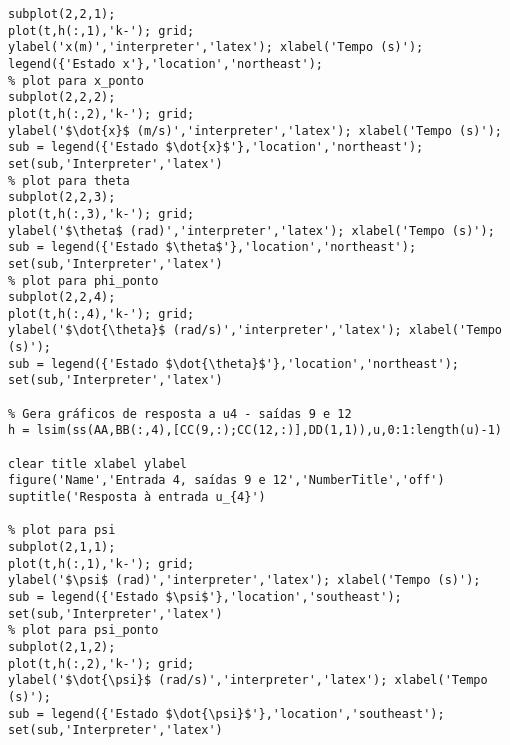 \begin{lstlisting}[inputencoding=latin1]
% plot para x
subplot(2,2,1);
plot(t,h(:,1),'k-'); grid;
ylabel('x(m)','interpreter','latex'); xlabel('Tempo (s)');
legend({'Estado x'},'location','northeast');
% plot para x_ponto
subplot(2,2,2);
plot(t,h(:,2),'k-'); grid;
ylabel('$\dot{x}$ (m/s)','interpreter','latex'); xlabel('Tempo (s)');
sub = legend({'Estado $\dot{x}$'},'location','northeast');
set(sub,'Interpreter','latex')
% plot para theta
subplot(2,2,3);
plot(t,h(:,3),'k-'); grid;
ylabel('$\theta$ (rad)','interpreter','latex'); xlabel('Tempo (s)');
sub = legend({'Estado $\theta$'},'location','northeast');
set(sub,'Interpreter','latex')
% plot para phi_ponto
subplot(2,2,4);
plot(t,h(:,4),'k-'); grid;
ylabel('$\dot{\theta}$ (rad/s)','interpreter','latex'); xlabel('Tempo (s)');
sub = legend({'Estado $\dot{\theta}$'},'location','northeast');
set(sub,'Interpreter','latex')

% Gera gráficos de resposta a u4 - saídas 9 e 12
h = lsim(ss(AA,BB(:,4),[CC(9,:);CC(12,:)],DD(1,1)),u,0:1:length(u)-1)

clear title xlabel ylabel
figure('Name','Entrada 4, saídas 9 e 12','NumberTitle','off')
suptitle('Resposta à entrada u_{4}')

% plot para psi
subplot(2,1,1);
plot(t,h(:,1),'k-'); grid;
ylabel('$\psi$ (rad)','interpreter','latex'); xlabel('Tempo (s)');
sub = legend({'Estado $\psi$'},'location','southeast');
set(sub,'Interpreter','latex')
% plot para psi_ponto
subplot(2,1,2);
plot(t,h(:,2),'k-'); grid;
ylabel('$\dot{\psi}$ (rad/s)','interpreter','latex'); xlabel('Tempo (s)');
sub = legend({'Estado $\dot{\psi}$'},'location','southeast');
set(sub,'Interpreter','latex')

\end{lstlisting}